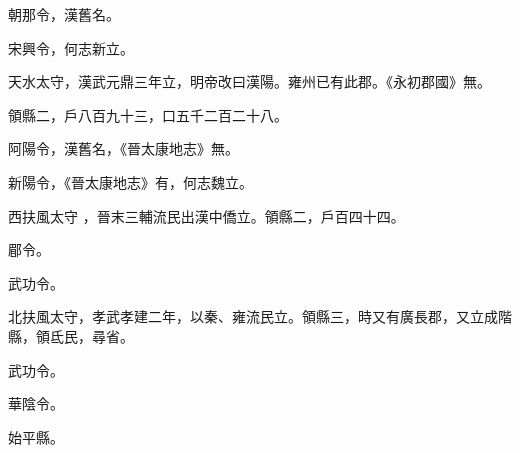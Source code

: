 \begin{pinyinscope}
 朝那令，漢舊名。



 宋興令，何志新立。



 天水太守，漢武元鼎三年立，明帝改曰漢陽。雍州已有此郡。《永初郡國》無。



 領縣二，戶八百九十三，口五千二百二十八。



 阿陽令，漢舊名，《晉太康地志》無。



 新陽令，《晉太康地志》有，何志魏立。


西扶風太守
 ，晉末三輔流民出漢中僑立。領縣二，戶百四十四。


郿令。


武功令。



 北扶風太守，孝武孝建二年，以秦、雍流民立。領縣三，時又有廣長郡，又立成階縣，領氐民，尋省。


武功令。


華陰令。


始平縣。



\end{pinyinscope}